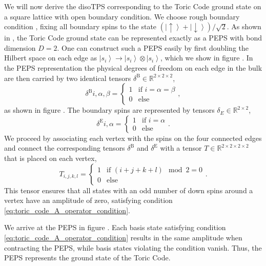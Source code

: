 We will now derive the disoTPS corresponding to the Toric Code ground state on a square lattice with open boundary condition. We choose rough boundary condition \cite{cite:models_for_gapped_boundaries_and_domain_walls}, fixing all boundary spins to the state $\left(\left|\uparrow\right\rangle + \left|\downarrow\right\rangle\right)/\sqrt{2}$. As shown in \cite{cite:isometric_tensor_network_representation_of_string_net_liquids}, the Toric Code ground state can be represented exactly as a PEPS with bond dimension $D = 2$. One can construct such a PEPS easily by first doubling the Hilbert space on each edge as $\left|s_i\right\rangle \rightarrow \left|s_i\right\rangle\otimes\left|s_i\right\rangle$, which we show in figure . In the PEPS representation the physical degrees of freedom on each edge in the bulk are then carried by two identical tensors $\delta^\text{B}\in\mathbb{R}^{2\times2\times2}$,
\begin{equation}
	\delta^\text{B}{i,\alpha,\beta} = \begin{cases}
		1 &\text{if }i=\alpha=\beta\\
		0 &\text{else}
	\end{cases},
\end{equation}
as shown in figure . The boundary spins are represented by tensors $\delta_E\in\mathbb{R}^{2\times2}$,
\begin{equation}
	\delta^\text{E}{i,\alpha} = \begin{cases}
		1 &\text{if }i=\alpha\\
		0 &\text{else}
	\end{cases}.
\end{equation}
We proceed by associating each vertex with the spins on the four connected edges and connect the corresponding tensors $\delta^\text{B}$ and $\delta^\text{E}$ with a tensor $T\in\mathbb{R}^{2\times2\times2\times2}$ that is placed on each vertex,
\begin{equation}
	T_{i,j,k,l} = \begin{cases}
		1 & \text{if } \left(i+j+k+l\right)\mod2 = 0 \\
		0 & \text{else}
	\end{cases}.
\end{equation}
This tensor ensures that all states with an odd number of down spins around a vertex have an amplitude of zero, satisfying condition \eqref{eq:toric_code_A_operator_condition}. \par
We arrive at the PEPS in figure . Each basis state satisfying condition \eqref{eq:toric_code_A_operator_condition} results in the same amplitude when contracting the PEPS, while basis states violating the condition vanish. Thus, the PEPS represents the ground state of the Toric Code. \par
